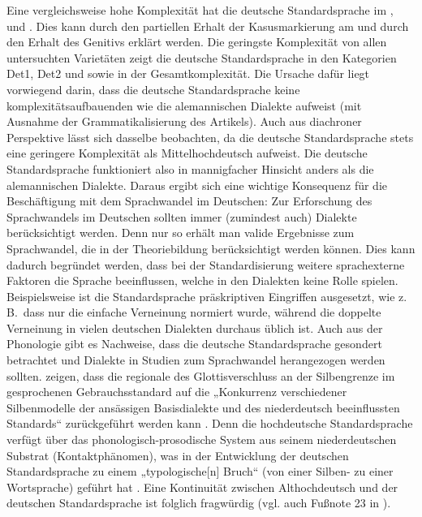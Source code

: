Eine vergleichsweise hohe Komplexität hat die deutsche Standardsprache im ,  und . Dies kann durch den partiellen Erhalt der Kasusmarkierung am  und durch den Erhalt des Genitivs erklärt werden. Die geringste Komplexität von allen untersuchten Varietäten zeigt die deutsche Standardsprache in den Kategorien Det1, Det2 und  sowie in der Gesamtkomplexität. Die Ursache dafür liegt vorwiegend darin, dass die deutsche Standardsprache keine komplexitätsaufbauenden  wie die alemannischen Dialekte aufweist (mit Ausnahme der Grammatikalisierung des Artikels). Auch aus diachroner Perspektive lässt sich dasselbe beobachten, da die deutsche Standardsprache stets eine geringere Komplexität als Mittelhochdeutsch aufweist. Die deutsche Standardsprache funktioniert also in mannigfacher Hinsicht anders als die alemannischen Dialekte. Daraus ergibt sich eine wichtige Konsequenz für die Beschäftigung mit dem Sprachwandel im Deutschen: Zur Erforschung des Sprachwandels im Deutschen sollten immer (zumindest auch) Dialekte berücksichtigt werden. Denn nur so erhält man valide Ergebnisse zum Sprachwandel, die in der Theoriebildung berücksichtigt werden können. Dies kann dadurch begründet werden, dass bei der Standardisierung weitere sprachexterne Faktoren die Sprache beeinflussen, welche in den Dialekten keine Rolle spielen. Beispielsweise ist die Standardsprache präskriptiven Eingriffen ausgesetzt, wie z.\,B.\, dass nur die einfache Verneinung normiert wurde, während die doppelte Verneinung in vielen deutschen Dialekten durchaus üblich ist. Auch aus der Phonologie gibt es Nachweise, dass die deutsche Standardsprache gesondert betrachtet und Dialekte in Studien zum Sprachwandel herangezogen werden sollten. \citet{PröllKleiner2016} zeigen, dass die regionale  des Glottisverschluss an der Silbengrenze im gesprochenen Gebrauchsstandard auf die „Konkurrenz verschiedener Silbenmodelle der ansässigen Basisdialekte und des niederdeutsch beeinflussten Standards“ zurückgeführt werden kann \citep[211]{PröllKleiner2016}. Denn die hochdeutsche Standardsprache verfügt über das phonologisch-prosodische System aus seinem niederdeutschen Substrat (Kontaktphänomen), was in der Entwicklung der deutschen Standardsprache zu einem „typologische[n] Bruch“ (von einer Silben- zu einer Wortsprache) geführt hat \citep[210]{PröllKleiner2016}. Eine Kontinuität zwischen Althochdeutsch und der deutschen Standardsprache ist folglich fragwürdig (vgl. auch Fußnote 23 in \citealt[210]{PröllKleiner2016}).\\

